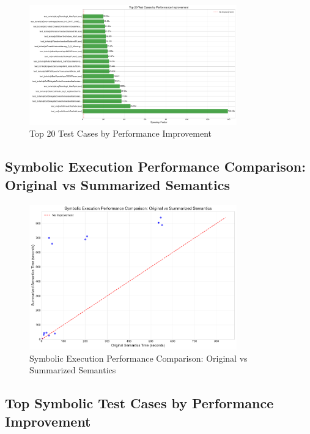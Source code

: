 \documentclass[article]{article}
\begin{document}
\begin{figure}[H]
\centering
\includegraphics[width=0.8\textwidth]{charts/concrete_test_case_improvement.pdf}
\caption{Top 20 Test Cases by Performance Improvement}
\label{fig:concrete_test_case_improvement}
\end{figure}

\newpage

\subsection{Symbolic Execution Performance Comparison: Original vs Summarized Semantics}\label{fig:symbolic_performance_scatter}

\begin{figure}[H]
\centering
\includegraphics[width=0.8\textwidth]{charts/symbolic_performance_scatter.pdf}
\caption{Symbolic Execution Performance Comparison: Original vs Summarized Semantics}
\label{fig:symbolic_performance_scatter}
\end{figure}

\newpage

\subsection{Top Symbolic Test Cases by Performance Improvement}\label{fig:symbolic_test_case_improvement}
\end{document}
